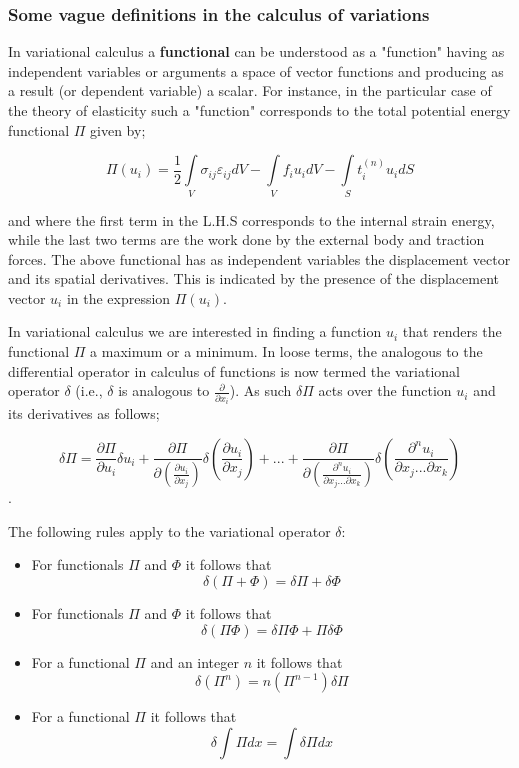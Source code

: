\subsubsection*{Some vague definitions in the calculus of variations}
In variational calculus a {\bf functional} can be understood as a "function" having as independent variables or arguments a space of vector functions and producing as a result (or dependent variable) a scalar. For instance, in the particular case of the theory of elasticity such a "function" corresponds to the total potential energy functional $\Pi$ given by;

\begin{equation}
\Pi ({u_i}) = \frac{1}{2}\int\limits_V {{\sigma _{ij}}{\varepsilon _{ij}}dV}  - \int\limits_V {{f_i}{u_i}dV}  - \int\limits_S {t_i^{(n)}{u_i}dS}
\label{Potential}
\end{equation}

and where the first term in the L.H.S corresponds to the internal strain energy, while the last two terms are the work done by the external body and traction forces. The above functional has as independent variables the displacement vector and its spatial derivatives. This is indicated by the presence of the displacement vector $u_i$ in the expression $\Pi(u_i)$.

In variational calculus we are interested in finding a function $u_i$ that renders the functional $\Pi$ a maximum or a minimum. In loose terms, the analogous to the differential operator in calculus of functions is now termed the variational operator $\delta$ (i.e., $\delta$ is analogous to $\frac{\partial }{{\partial {x_i}}}$). As such $\delta\Pi$ acts over the function $u_i$ and its derivatives as follows;

\[\delta \Pi  = \frac{{\partial \Pi }}{{\partial {u_i}}}\delta {u_i} + \frac{{\partial \Pi }}{{\partial \left( {\frac{{\partial {u_i}}}{{\partial {x_j}}}} \right)}}\delta \left( {\frac{{\partial {u_i}}}{{\partial {x_j}}}} \right) + ... + \frac{{\partial \Pi }}{{\partial \left( {\frac{{{\partial ^n}{u_i}}}{{\partial {x_j}...\partial {x_k}}}} \right)}}\delta \left( {\frac{{{\partial ^n}{u_i}}}{{\partial {x_j}...\partial {x_k}}}} \right)\].

The following rules apply to the variational operator $\delta$:

\begin{itemize}
\item For functionals $\Pi$ and $\Phi$ it follows that \[\delta (\Pi  + \Phi ) = \delta \Pi  + \delta \Phi \]
\item For functionals $\Pi$ and $\Phi$ it follows that \[\delta (\Pi \Phi ) = \delta \Pi \Phi  + \Pi \delta \Phi \]
\item For a functional $\Pi$ and an integer $n$ it follows that \[\delta ({\Pi ^n}) = n({\Pi ^{n - 1}})\delta \Pi \]
\item For a functional $\Pi$ it follows that \[\delta \int {\Pi dx}  = \int {\delta \Pi dx} \]
\end{itemize}

